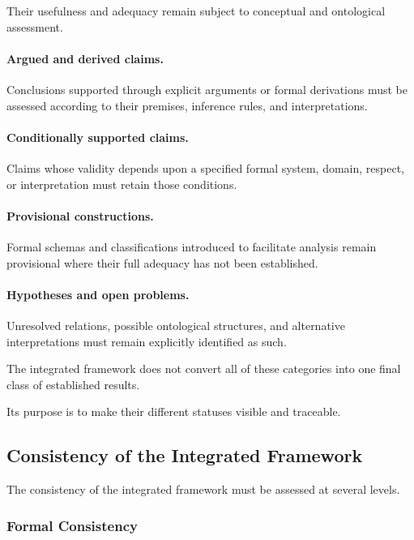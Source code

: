 Their usefulness and
adequacy remain subject
to conceptual and
ontological assessment.

\paragraph{Argued and derived claims.}

Conclusions supported
through explicit arguments
or formal derivations
must be assessed
according to their
premises, inference
rules, and interpretations.

\paragraph{Conditionally supported claims.}

Claims whose validity
depends upon a
specified formal system,
domain, respect, or
interpretation must
retain those conditions.

\paragraph{Provisional constructions.}

Formal schemas and
classifications introduced
to facilitate analysis
remain provisional
where their full
adequacy has not
been established.

\paragraph{Hypotheses and open problems.}

Unresolved relations,
possible ontological
structures, and
alternative interpretations
must remain explicitly
identified as such.

The integrated framework
does not convert
all of these categories
into one final
class of established
results.

Its purpose is
to make their
different statuses
visible and traceable.

\subsection{Consistency of the Integrated Framework}

The consistency of
the integrated framework
must be assessed
at several levels.

\subsubsection{Formal Consistency}

